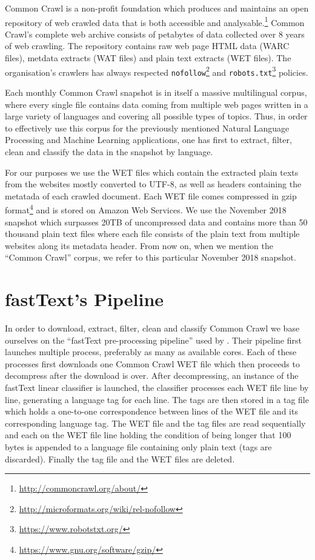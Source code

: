 Common Crawl is a non-profit foundation which produces and maintains an open repository of web crawled data that is both accessible and analysable.\footnote{\url{http://commoncrawl.org/about/}} Common Crawl's complete web archive consists of petabytes of data collected over 8 years of web crawling. The repository contains raw web page HTML data (WARC files), metdata extracts (WAT files) and plain text extracts (WET files). The organisation's crawlers has always respected \texttt{nofollow}\footnote{\url{http://microformats.org/wiki/rel-nofollow}} and \texttt{robots.txt}\footnote{\url{https://www.robotstxt.org/}} policies.

Each monthly Common Crawl snapshot is in itself a massive multilingual corpus, where every single file contains data coming from multiple web pages written in a large variety of languages and covering all possible types of topics. Thus, in order to effectively use this corpus for the previously mentioned Natural Language Processing and Machine Learning applications, one has first to extract, filter, clean and classify the data in the snapshot by language.

For our purposes we use the WET files which contain the extracted plain texts from the websites mostly converted to UTF-8, as well as headers containing the metatada of each crawled document. Each WET file comes compressed in gzip format\footnote{\url{https://www.gnu.org/software/gzip/}} and is stored on Amazon Web Services. We use the November 2018 snapshot which surpasses 20TB of uncompressed data and contains more than 50 thousand plain text files where each file consists of the plain text from multiple websites along its metadata header. From now on, when we mention the ``Common Crawl'' corpus, we refer to this particular November 2018 snapshot.

\section{fastText's Pipeline}

In order to download, extract, filter, clean and classify Common Crawl we base ourselves on the ``fastText pre-processing pipeline'' used by \citet{Grave:2018}. Their pipeline first launches multiple process, preferably as many as available cores. Each of these processes first downloads one Common Crawl WET file which then proceeds to decompress after the download is over. After decompressing, an instance of the fastText linear classifier \citep{Joulin:2016, Joulin:2017} is launched, the classifier processes each WET file line by line, generating a language tag for each line. The tags are then stored in a tag file which holds a one-to-one correspondence between lines of the WET file and its corresponding language tag. The WET file and the tag files are read sequentially and each on the WET file line holding the condition of being longer that 100 bytes is appended to a language file containing only plain text (tags are discarded). Finally the tag file and the WET files are deleted.

